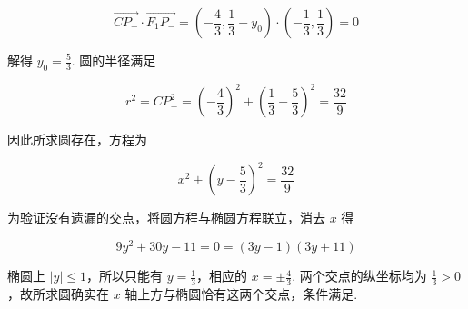 \begin{solution}
\begin{enumerate}
\[
\overrightarrow{CP_{-}}\cdot\overrightarrow{F_1P_{-}}
=\left(-\frac43,\frac13-y_0\right)\cdot\left(-\frac13,\frac13\right)=0
\]

解得 \(y_0=\frac53\). 圆的半径满足

\[
r^2=CP_{-}^2
=\left(-\frac43\right)^2+\left(\frac13-\frac53\right)^2
=\frac{32}{9}
\]

因此所求圆存在，方程为

\[
x^2+\left(y-\frac53\right)^2=\frac{32}{9}
\]

为验证没有遗漏的交点，将圆方程与椭圆方程联立，消去 \(x\) 得

\[
9y^2+30y-11=0=(3y-1)(3y+11)
\]

椭圆上 \(|y|\leqslant1\)，所以只能有 \(y=\frac13\)，相应的 \(x=\pm\frac43\). 两个交点的纵坐标均为 \(\frac13>0\)，故所求圆确实在 \(x\) 轴上方与椭圆恰有这两个交点，条件满足.
\end{enumerate}
\end{solution}
